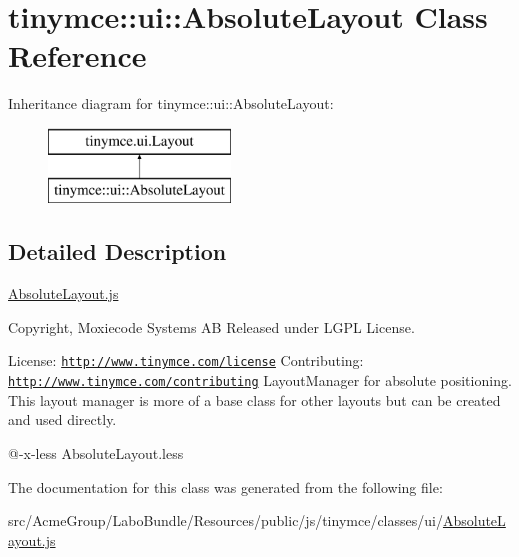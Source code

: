 \hypertarget{classtinymce_1_1ui_1_1_absolute_layout}{\section{tinymce\+:\+:ui\+:\+:Absolute\+Layout Class Reference}
\label{classtinymce_1_1ui_1_1_absolute_layout}
}
Inheritance diagram for tinymce\+:\+:ui\+:\+:Absolute\+Layout\+:\begin{figure}[H]
\begin{center}
\leavevmode
\includegraphics[height=2.000000cm]{classtinymce_1_1ui_1_1_absolute_layout}
\end{center}
\end{figure}


\subsection{Detailed Description}
\hyperlink{_absolute_layout_8js}{Absolute\+Layout.\+js}

Copyright, Moxiecode Systems A\+B Released under L\+G\+P\+L License.

License\+: \href{http://www.tinymce.com/license}{\tt http\+://www.\+tinymce.\+com/license} Contributing\+: \href{http://www.tinymce.com/contributing}{\tt http\+://www.\+tinymce.\+com/contributing} Layout\+Manager for absolute positioning. This layout manager is more of a base class for other layouts but can be created and used directly.

@-\/x-\/less Absolute\+Layout.\+less 

The documentation for this class was generated from the following file\+:\begin{DoxyCompactItemize}
\item 
src/\+Acme\+Group/\+Labo\+Bundle/\+Resources/public/js/tinymce/classes/ui/\hyperlink{_absolute_layout_8js}{Absolute\+Layout.\+js}\end{DoxyCompactItemize}
